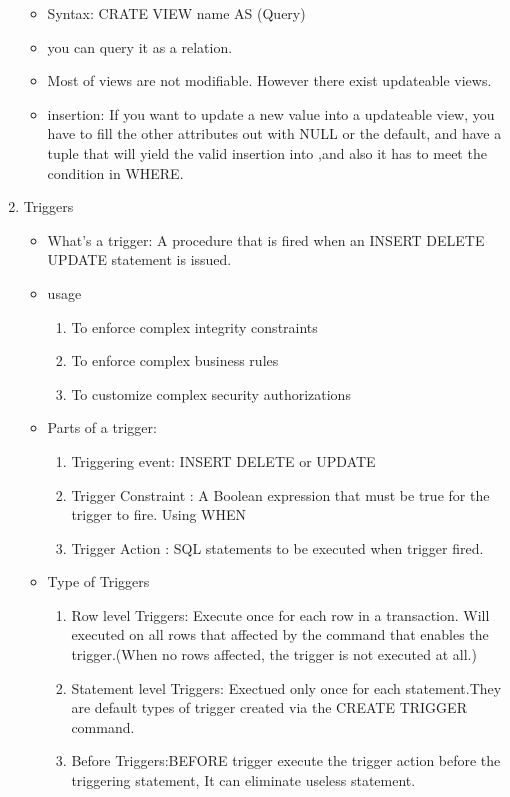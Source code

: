 \begin{enumerate}
\begin{itemize}
        \item Syntax: CRATE VIEW name AS (Query)
        \item you can query it as a relation.
        \item Most of views are not modifiable. However there exist updateable views.
        \item insertion: If you want to update a new value into a updateable view, you have to  fill the other attributes out with NULL or
the default, and have a tuple that will yield the valid
insertion into ,and also it has to meet the condition in WHERE.
    \end{itemize}
    \item Triggers
    \begin{itemize}
        \item What's a trigger: A procedure that is fired when an INSERT DELETE UPDATE statement is issued.
        \item usage \begin{enumerate}
            \item To enforce complex integrity constraints
            \item To enforce complex business rules
            \item To customize complex security authorizations
        \end{enumerate} 
        \item Parts of a trigger:\begin{enumerate}
            \item Triggering event: INSERT DELETE or UPDATE
            \item Trigger Constraint : A Boolean expression that must be true for the trigger to fire. Using WHEN
            \item Trigger Action : SQL statements to be executed when trigger fired.
        \end{enumerate}
        \item Type of Triggers\begin{enumerate}
            \item Row level Triggers: Execute once for each row in a transaction. Will executed on all rows that affected by the command that enables the trigger.(When no rows affected, the trigger is not executed at all.)
            \item Statement level Triggers: Exectued only once for each statement.They are default types of trigger created via the CREATE TRIGGER command.
            \item Before Triggers:BEFORE trigger execute the trigger action before the triggering statement, It can eliminate useless statement.

\end{enumerate}
\end{itemize}
\end{enumerate}
